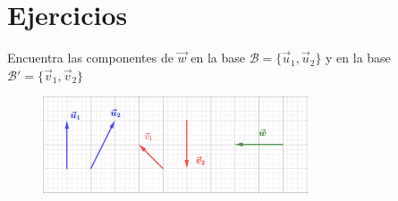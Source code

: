 
	





\newpage

\section{Ejercicios}

\vspace{0.5cm}



\begin{mipropuesto}

Encuentra las componentes de $\vec w$ en la base $\mathcal B=\{\vec u_1,\vec u_2\}$ y en la base $\mathcal B'=\{\vec v_1,\vec v_2\}$	

	\begin{figure}[H]
	\centering
	\includegraphics[width=0.7\textwidth]{img-vec/vec17.png}	
\end{figure}
\end{mipropuesto}

\vspace{-8mm}
\begin{flushright}
\begin{footnotesize} \textcolor{gris}{}	\end{footnotesize}
\end{flushright}





